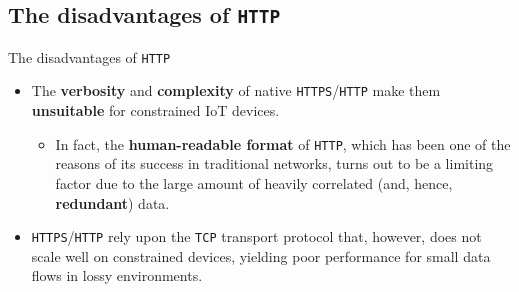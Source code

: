 \documentclass[10pt]{beamer}
\begin{document}
\subsection{The disadvantages of \texttt{HTTP}}
\begin{frame}{The disadvantages of \texttt{HTTP}}

\begin{itemize}
\justifying
\item The \textbf{verbosity} and \textbf{complexity} of native \texttt{HTTPS}/\texttt{HTTP} make them \textbf{unsuitable} for constrained IoT devices. 

\begin{itemize}
\justifying
\item In fact, the \textbf{human-readable format} of \texttt{HTTP}, which has been one of the reasons of its success in traditional networks, turns out to be a limiting factor due to the large amount of heavily correlated (and, hence, \textbf{redundant}) data.
\end{itemize}

\item \texttt{HTTPS}/\texttt{HTTP} rely upon the \texttt{TCP} transport protocol that, however, does not scale well on constrained devices, yielding poor performance for small data flows in lossy environments.
\end{itemize}

\end{frame} 
\end{document}
